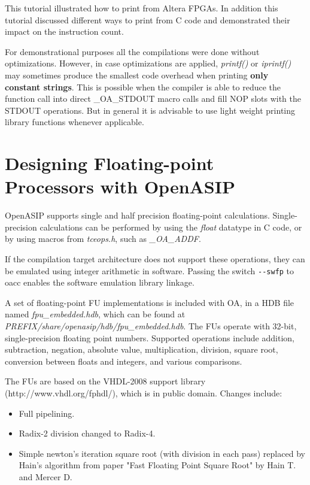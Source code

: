 \documentclass[a4paper,twoside]{tceusermanual}
\begin{document}
This tutorial illustrated how to print from Altera FPGAs. In addition
this tutorial discussed different ways to print from C code and
demonstrated their impact on the instruction count.

For demonstrational purposes all the compilations were done without
optimizations. However, in case optimizations are applied,
\textit{printf()} or \textit{iprintf()} may sometimes produce the
smallest code overhead when printing \textbf{only constant strings}.
This is possible when the compiler is able to reduce the function call
into direct \_OA\_STDOUT macro calls and fill NOP slots with the
STDOUT operations. But in general it is advisable to use light weight
printing library functions whenever applicable.


\section{Designing Floating-point Processors with OpenASIP}

OpenASIP supports single and half precision floating-point calculations. Single-precision calculations
can be performed by using the \emph{float} datatype in C code, or by using macros from 
\emph{tceops.h}, such as \emph{\_OA\_ADDF}. 

If the compilation target architecture does not support these operations, 
they can be emulated using integer arithmetic in software. Passing the switch \verb|--swfp| 
to oacc enables the software emulation library linkage.

A set of floating-point FU implementations is included with OA, in a HDB file named 
\emph{fpu\_embedded.hdb}, which can be found at \emph{PREFIX/share/openasip/hdb/fpu\_embedded.hdb}. 
The FUs operate with 32-bit, single-precision floating point numbers. 
Supported operations include addition, subtraction, negation, absolute value, 
multiplication, division, square root, conversion between floats and integers, 
and various comparisons.

The FUs are based on the VHDL-2008 support library (http://www.vhdl.org/fphdl/), 
which is in public domain. Changes include:

\begin{itemize}
 \item Full pipelining.
 \item Radix-2 division changed to Radix-4.
 \item Simple newton's iteration square root (with division in each pass) replaced 
by Hain's algorithm from paper "Fast Floating Point Square Root" by Hain T. and Mercer D.
\end{itemize}
\end{document}
